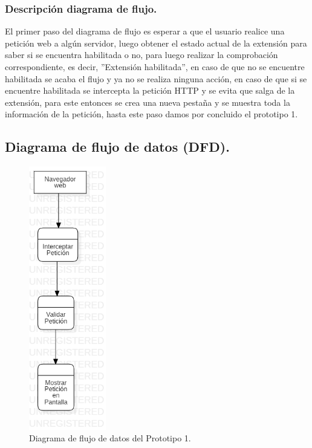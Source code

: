 \documentclass[12pt, a4paper, titlepage]{report}
\begin{document}
		        \subsubsection{Descripción diagrama de flujo.}
		        El primer paso del diagrama de flujo es esperar a que el usuario realice una petición web a algún servidor, luego obtener el estado actual de la extensión para saber si se encuentra habilitada o no, para luego realizar la comprobación correspondiente, es decir, ''Extensión habilitada'', en caso de que no se encuentre habilitada se acaba el flujo y ya no se realiza ninguna acción, en caso de que si se encuentre habilitada se intercepta la petici\'on HTTP y se evita que salga de la extensión, para este entonces se crea una nueva pestaña y se muestra toda la información de la petici\'on, hasta este paso damos por concluido el prototipo 1.
    			\subsection{Diagrama de flujo de datos (DFD).}
        			\begin{figure}[H]
        			    \begin{center}
    			        \includegraphics[width=0.3\textwidth]{imagenes/Desarrollo/Prototipo_1/DFD_P1.png}
    			        \caption{Diagrama de flujo de datos del Prototipo 1.}
    				\end{center}
    			\end{figure}
\end{document}
